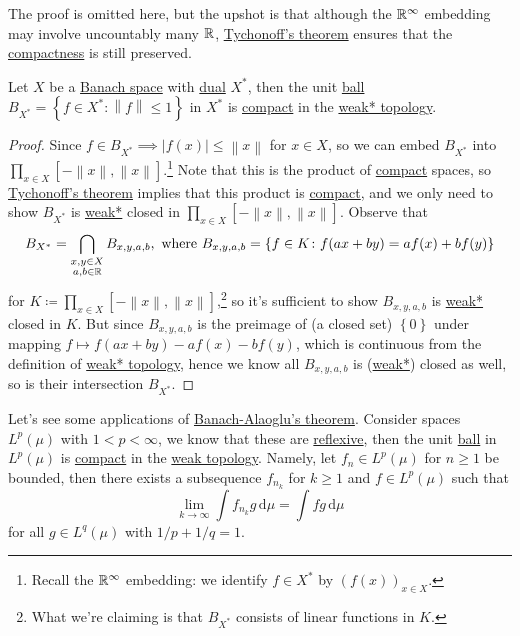The proof is omitted here, but the upshot is that although the \(\mathbb{\MakeUppercase{r}} ^{\infty} \) embedding may involve uncountably many \(\mathbb{\MakeUppercase{r}} \), \hyperref[thm:Tychonoff]{Tychonoff's theorem} ensures that the \hyperref[def:compact]{compactness} is still preserved.

\begin{theorem}\label{thm:Banach-Alaoglu}
	Let \(X\) be a \hyperref[def:Banach-space]{Banach space} with \hyperref[def:dual-space]{dual} \(X^{\ast} \), then the unit \hyperref[def:ball]{ball} \(B_{X^{\ast} }= \left\{ f\in X^{\ast} \colon \left\lVert f\right\rVert \leq 1 \right\}\) in \(X^{\ast} \) is \hyperref[def:compact]{compact} in the \hyperref[def:weak*-topology]{weak* topology}.
\end{theorem}
\begin{proof}
	Since \(f\in B_{X^{\ast} }\implies \left\vert f(x) \right\vert \leq \left\lVert x\right\rVert\) for \(x\in X\), so we can embed \(B_{X^{\ast} }\) into \(\prod_{x\in X} [-\left\lVert x\right\rVert , \left\lVert x\right\rVert]\).\footnote{Recall the \(\mathbb{\MakeUppercase{r}} ^{\infty} \) embedding: we identify \(f\in X^{\ast} \) by \((f(x))_{x\in X}\).} Note that this is the product of \hyperref[def:compact]{compact} spaces, so \hyperref[thm:Tychonoff]{Tychonoff's theorem} implies that this product is \hyperref[def:compact]{compact}, and we only need to show \(B_{X^{\ast} }\) is \hyperref[def:weak*-topology]{weak*} closed in \(\prod_{x\in X} [-\left\lVert x\right\rVert , \left\lVert x\right\rVert]\). Observe that
	\[
		B_{X^{\ast} } = \bigcap_{\substack{x, y\in X\\ a, b\in \mathbb{\MakeUppercase{r}} }}B_{x, y, a, b}, \text{ where } B_{x, y, a, b} = \left\{ f\in K\colon f(ax+by) = af(x) + bf(y) \right\}
	\]
	for \(K \coloneqq \prod_{x\in X}[-\left\lVert x\right\rVert , \left\lVert x\right\rVert ]\),\footnote{What we're claiming is that \(B_{X^{\ast} }\) consists of linear functions in \(K\).} so it's sufficient to show \(B_{x, y, a, b}\) is \hyperref[def:weak*-topology]{weak*} closed in \(K\). But since \(B_{x, y, a, b}\) is the preimage of (a closed set) \(\left\{ 0 \right\} \) under mapping \(f \mapsto f(ax+by) - af(x) - bf(y)\), which is continuous from the definition of \hyperref[def:weak*-topology]{weak* topology}, hence we know all \(B_{x, y, a, b}\) is (\hyperref[def:weak*-topology]{weak*}) closed as well, so is their intersection \(B_{X^{\ast} }\).
\end{proof}
Let's see some applications of \hyperref[thm:Banach-Alaoglu]{Banach-Alaoglu's theorem}. Consider spaces \(L^p(\mu )\) with \(1 < p < \infty\), we know that these are \hyperref[def:reflexive-space]{reflexive}, then the unit \hyperref[def:ball]{ball} in \(L^p(\mu )\) is \hyperref[def:compact]{compact} in the \hyperref[def:weak-topology]{weak topology}. Namely, let \(f_n\in L^p(\mu )\) for \(n \geq 1\) be bounded, then there exists a subsequence \(f_{n_k}\) for \(k\geq 1\) and \(f\in L^p(\mu )\) such that
\[
	\lim_{k \to \infty} \int f_{n_k}g\,\mathrm{d} \mu = \int fg\,\mathrm{d} \mu
\]
for all \(g\in L^{q}(\mu )\) with \(1 / p + 1 / q = 1\).

